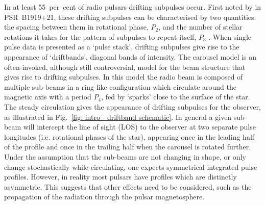 In at least 55~per~cent of radio pulsars \citep{WESx2007} drifting subpulses occur. First noted by \citet{DCxx1968} in PSR~B1919+21, these drifting subpulses can be characterised by two quantities: the spacing between them in rotational phase, $P_2$, and the number of stellar rotations it takes for the pattern of subpulses to repeat itself, $P_3$ \citep{SSPW1970}. When single-pulse data is presented as a `pulse stack', drifting subpulses give rise to the appearance of `driftbands', diagonal bands of intensity. The carousel model \citep{RSxx1975} is an often-invoked, although still controversial, model for the beam structure that gives rise to drifting subpulses. In this model the radio beam is composed of multiple sub-beams in a ring-like configuration which circulate around the magnetic axis with a period $P_4$, fed by `sparks' close to the surface of the star. The steady circulation gives the appearance of drifting subpulses for the observer, as illustrated in Fig.~\ref{fig: intro - driftband schematic}. In general a given sub-beam will intercept the line of sight (LOS) to the observer at two separate pulse longitudes (i.e. rotational phases of the star), appearing once in the leading half of the profile and once in the trailing half when the carousel is rotated further. Under the assumption that the sub-beams are not changing in shape, or only change stochastically while circulating, one expects symmetrical integrated pulse profiles. However, in reality most pulsars have profiles which are distinctly asymmetric. This suggests that other effects need to be considered, such as the propagation of the radiation through the pulsar magnetosphere.

